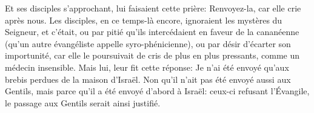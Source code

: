 Et ses disciples s’approchant, lui faisaient cette prière:
	Renvoyez-la, car elle crie après nous.
Les disciples, en ce temps-là encore, ignoraient les mystères du Seigneur,
	et c’était, ou par pitié qu’ils intercédaient en faveur de la cananéenne
	(qu’un autre évangéliste appelle syro-phénicienne),
	ou par désir d’écarter son importunité,
	car elle le poursuivait de cris de plus en plus pressants,
		comme un médecin insensible.
Mais lui, leur fit cette réponse:
	Je n’ai été envoyé qu’aux brebis perdues de la maison d’Israël.
Non qu’il n’ait pas été envoyé aussi aux Gentils,
	mais parce qu’il a été envoyé d’abord à Israël:
	ceux-ci refusant l’Évangile, le passage aux Gentils serait ainsi justifié.
